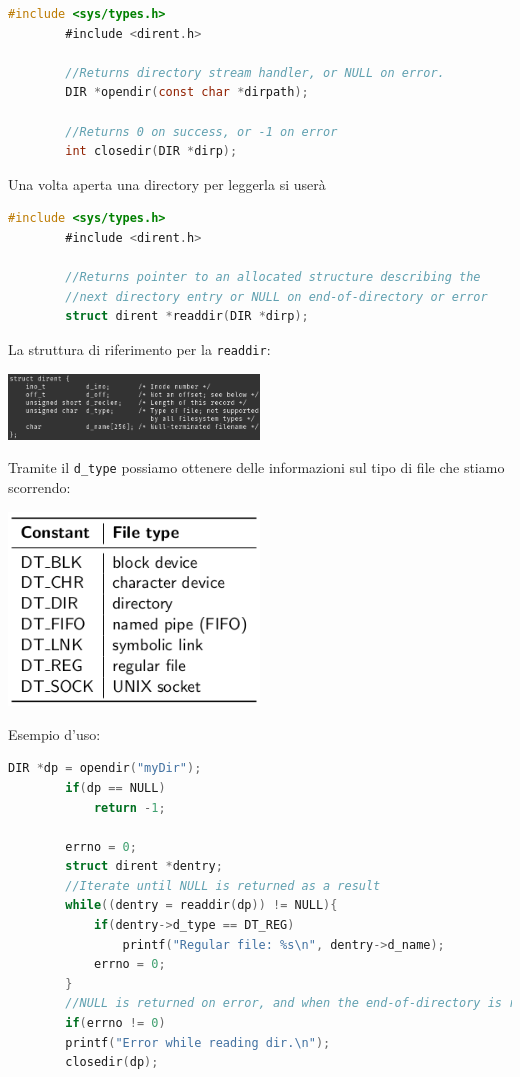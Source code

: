 \documentclass[a4paper, 12pt]{book}
\begin{document}
    \begin{lstlisting}[language=C]
        #include <sys/types.h>
        #include <dirent.h>

        //Returns directory stream handler, or NULL on error.
        DIR *opendir(const char *dirpath);

        //Returns 0 on success, or -1 on error
        int closedir(DIR *dirp);
    \end{lstlisting}
    Una volta aperta una directory per leggerla si userà
    \begin{lstlisting}[language=C]
        #include <sys/types.h>
        #include <dirent.h>

        //Returns pointer to an allocated structure describing the
        //next directory entry or NULL on end-of-directory or error
        struct dirent *readdir(DIR *dirp);
    \end{lstlisting}
    La struttura di riferimento per la \verb|readdir|:
    \begin{center}
        \includegraphics[width=0.5\textwidth]{dirent.png}
    \end{center}
    Tramite il \verb|d_type| possiamo ottenere delle informazioni
    sul tipo di file che stiamo scorrendo:
    \begin{center}
        \includegraphics[width=0.5\textwidth]{d_type.png}
    \end{center}
    Esempio d'uso:
    \begin{lstlisting}[language=C]
        DIR *dp = opendir("myDir");
        if(dp == NULL)
            return -1;
        
        errno = 0;
        struct dirent *dentry;
        //Iterate until NULL is returned as a result
        while((dentry = readdir(dp)) != NULL){
            if(dentry->d_type == DT_REG)
                printf("Regular file: %s\n", dentry->d_name);
            errno = 0;
        }
        //NULL is returned on error, and when the end-of-directory is reached!
        if(errno != 0)
        printf("Error while reading dir.\n");
        closedir(dp);
    \end{lstlisting}
\end{document}
